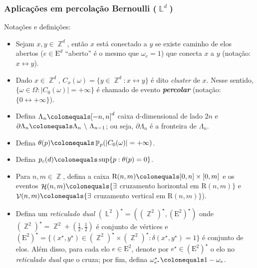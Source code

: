 \documentclass[9pt]{beamer}
\theoremstyle{definition} %
\DeclareMathOperator{\PX}{\mathbb{P}} %
\DeclareMathOperator{\ZX}{\mathbb{Z}} %
\DeclareMathOperator{\LX}{\mathbb{L}} %
\DeclareMathOperator{\HC}{\mathcal{H}} %
\DeclareMathOperator{\VC}{\mathcal{V}} %
\begin{document}
	\begin{frame}[t]
		\frametitle{Aplicações em percolação Bernoulli ($\LX^d$)}
		Notações e definições:
		\begin{itemize}
			\item Sejam $x, y \in \ZX^d$, então $x$ está conectado a $y$ se existe caminho de elos abertos ($e \in \text{E}^d$ ``aberto'' é o mesmo que $\omega_e = 1$) que conecta $x$ a $y$ (notação: $x \leftrightarrow y$).
			\pause
			
			\item Dado $x \in \ZX^d$, $C_x(\omega) = \{y \in \ZX^d : x \leftrightarrow y\}$ é dito \textit{cluster} de $x$. Nesse sentido, $\{\omega \in \Omega : |C_0(\omega)| = +\infty\}$ é chamado de evento \textit{\textbf{percolar}} (notação: $\{0 \leftrightarrow +\infty\}$).
			\pause
			
			\item Defina $\Lambda_n \colonequals [-n, n]^d$ caixa d-dimensional de lado $2n$ e $\partial\Lambda_n \colonequals \Lambda_n \text{~\textbackslash~} \Lambda_{n - 1}$; ou seja, $\partial\Lambda_n$ é a fronteira de $\Lambda_n$.
			\pause
			
			\item Defina $\theta(p) \colonequals \PX_p(|C_0(\omega)| = +\infty)$.
			\pause
			
			\item Defina $p_c(d) \colonequals \sup\{p:\theta(p) = 0\}$.
			\pause
			
			\item Para $n, m \in \ZX$, defina a caixa $\text{R}(n, m) \colonequals [0, n] \times [0, m]$ e os eventos $\HC(n, m) \colonequals \{\exists$ cruzamento horizontal em $\text{R}(n, m)\}$ e $\VC(n, m) \colonequals \{\exists$ cruzamento vertical em $\text{R}(n, m)\}$).
			\pause
			
			\item Defina um \textit{reticulado dual} $(\LX^2)^{\star} = ((\ZX^2)^{\star}, (\text{E}^2)^{\star})$ onde $(\ZX^2)^{\star} = \ZX^2 + \left(\frac{1}{2}, \frac{1}{2}\right)$ é conjunto de vértices e $(\text{E}^2)^{\star} = \{(x^{\star}, y^{\star}) \in (\ZX^2)^{\star} \times (\ZX^2)^{\star} : \delta(x^{\star}, y^{\star}) = 1\}$ é conjunto de elos. Além disso, para cada elo $e \in \text{E}^2$, denote por $e^{\star} \in (\text{E}^2)^{\star}$ o elo no \textit{reticulado dual} que o cruza; por fim, defina $\omega^{\star}_{e^{\star}} \colonequals 1 - \omega_e$.
		\end{itemize}
	\end{frame}
	
\end{document}
